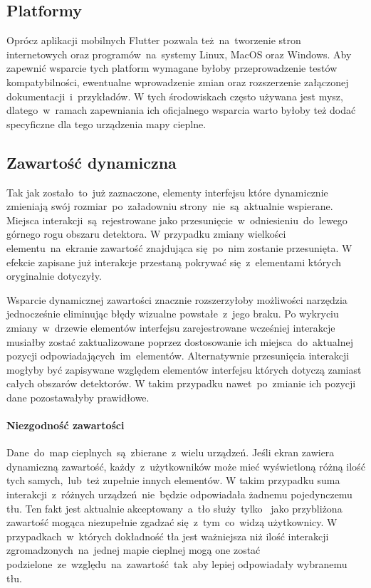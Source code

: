 \subsection{Platformy}
Oprócz aplikacji mobilnych Flutter pozwala też~na~tworzenie stron internetowych oraz programów~na~systemy Linux, MacOS oraz Windows. Aby zapewnić wsparcie tych platform wymagane byłoby przeprowadzenie testów kompatybilności, ewentualne wprowadzenie zmian oraz rozszerzenie załączonej dokumentacji~i~przykładów. W tych środowiskach często używana jest mysz, dlatego~w~ramach zapewniania ich oficjalnego wsparcia warto byłoby też dodać specyficzne dla tego urządzenia mapy cieplne.

\subsection{Zawartość dynamiczna}
Tak jak zostało~to~już zaznaczone, elementy interfejsu które dynamicznie zmieniają swój rozmiar~po~załadowniu strony~nie~są~aktualnie wspierane. Miejsca interakcji~są~rejestrowane jako przesunięcie~w~odniesieniu~do~lewego górnego rogu obszaru detektora. W przypadku zmiany wielkości elementu~na~ekranie zawartość znajdująca się~po~nim zostanie przesunięta. W efekcie zapisane już interakcje przestaną pokrywać się~z~elementami których oryginalnie dotyczyły. 

Wsparcie dynamicznej zawartości znacznie rozszerzyłoby możliwości narzędzia jednocześnie eliminując błędy wizualne powstałe~z~jego braku. Po wykryciu zmiany~w~drzewie elementów interfejsu zarejestrowane wcześniej interakcje musiałby zostać zaktualizowane poprzez dostosowanie ich miejsca~do~aktualnej pozycji odpowiadających~im~elementów. Alternatywnie przesunięcia interakcji mogłyby być zapisywane względem elementów interfejsu których dotyczą zamiast całych obszarów detektorów. W takim przypadku nawet~po~zmianie ich pozycji dane pozostawałyby prawidłowe.

\paragraph{Niezgodność zawartości}
Dane~do~map cieplnych~są~zbierane~z~wielu urządzeń. Jeśli ekran zawiera dynamiczną zawartość, każdy~z~użytkowników może mieć wyświetloną różną ilość tych samych,~lub~też zupełnie innych elementów. W takim przypadku suma interakcji~z~różnych urządzeń~nie~będzie odpowiadała żadnemu pojedynczemu tłu. Ten fakt jest aktualnie akceptowany~a~tło służy~tylko~ jako przybliżona zawartość mogąca niezupełnie zgadzać się~z~tym~co~widzą użytkownicy. W przypadkach~w~których dokładność tła jest ważniejsza niż ilość interakcji zgromadzonych~na~jednej mapie cieplnej mogą one zostać podzielone~ze~względu~na~zawartość~tak~aby lepiej odpowiadały wybranemu tłu.

